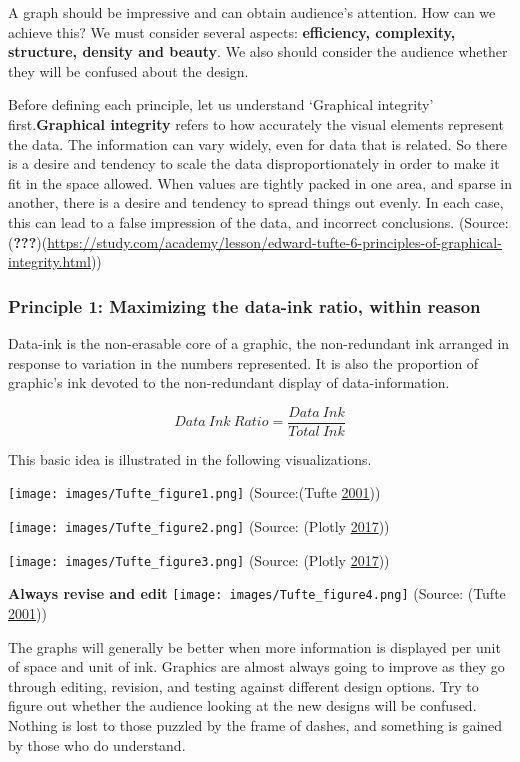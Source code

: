 \documentclass[]{book}
\begin{document}
A graph should be impressive and can obtain audience's attention. How
can we achieve this? We must consider several aspects:
\textbf{efficiency, complexity, structure, density and beauty}. We also
should consider the audience whether they will be confused about the
design.

Before defining each principle, let us understand `Graphical integrity'
first.\textbf{Graphical integrity} refers to how accurately the visual
elements represent the data. The information can vary widely, even for
data that is related. So there is a desire and tendency to scale the
data disproportionately in order to make it fit in the space allowed.
When values are tightly packed in one area, and sparse in another, there
is a desire and tendency to spread things out evenly. In each case, this
can lead to a false impression of the data, and incorrect conclusions.
(Source:({\textbf{???}})(\url{https://study.com/academy/lesson/edward-tufte-6-principles-of-graphical-integrity.html}))

\subsubsection{Principle 1: Maximizing the data-ink ratio, within
reason}\label{principle-1-maximizing-the-data-ink-ratio-within-reason}

Data-ink is the non-erasable core of a graphic, the non-redundant ink
arranged in response to variation in the numbers represented. It is also
the proportion of graphic's ink devoted to the non-redundant display of
data-information.

\[{Data \ Ink \ Ratio} = \frac{{Data \ Ink}}{{Total \ Ink}}\]

This basic idea is illustrated in the following visualizations.

\texttt{[image: images/Tufte\_figure1.png]} (Source:(Tufte
\protect\hyperlink{ref-Tufte_2001}{2001}))

\texttt{[image: images/Tufte\_figure2.png]} (Source: (Plotly
\protect\hyperlink{ref-appli_2017}{2017}))

\texttt{[image: images/Tufte\_figure3.png]} (Source: (Plotly
\protect\hyperlink{ref-appli_2017}{2017}))

\textbf{Always revise and edit}
\texttt{[image: images/Tufte\_figure4.png]} (Source: (Tufte
\protect\hyperlink{ref-Tufte_2001}{2001}))

The graphs will generally be better when more information is displayed
per unit of space and unit of ink. Graphics are almost always going to
improve as they go through editing, revision, and testing against
different design options. Try to figure out whether the audience looking
at the new designs will be confused. Nothing is lost to those puzzled by
the frame of dashes, and something is gained by those who do understand.
\end{document}
